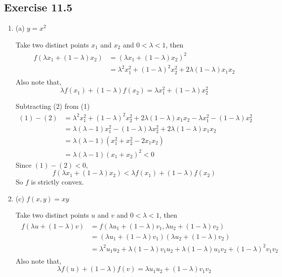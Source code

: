\documentclass{./../../Latex/homework}
\begin{document}
\thispagestyle{plain}

\subsection*{Exercise 11.5} 

\begin{enumerate}
\item (a) $ y = x^2 $
	
	Take two distinct points $x_1$ and $x_2$ and $0<\lambda<1$, then
	\begin{align}
	\begin{split}
		f\left(\lambda x_{1}+(1-\lambda) x_{2}\right) & =\left(\lambda x_{1}+(1-\lambda) x_{2}\right)^{2} \\
& =\lambda^{2} x_{1}^{2}+(1-\lambda)^{2} x_{2}^{2}+2 \lambda(1-\lambda) x_{1} x_{2}
\end{split}
\end{align}
Also note that, 
\begin{equation}
\lambda f\left(x_{1}\right)+(1-\lambda) f\left(x_{2}\right)=\lambda x_{1}^{2}+(1-\lambda) x_{2}^{2} 
\end{equation}

Subtracting (2) from (1)
$$  
\begin{aligned}
(1)-(2) &= \lambda^{2} x_{1}^{2}+(1-\lambda)^{2} x_{2}^{2}+2 \lambda(1-\lambda) x_{1} x_{2}-\lambda x_{1}^{2}-(1-\lambda) x_{2}^{2} \\
&= \lambda(\lambda-1) x_{1}^{2}-(1-\lambda) \lambda x_{2}^{2}+2 \lambda(1-\lambda) x_{1} x_{2} \\
&= \lambda(\lambda-1)\left(x_{1}^{2}+x_{2}^{2}-2 x_{1} x_{2}\right) \\
&= \lambda(\lambda-1)\left(x_{1}+x_{2}\right)^{2}<0 
\end{aligned}
  $$
Since $(1)-(2)<0$, 
$$ f\left(\lambda x_{1}+(1-\lambda) x_{2}\right)<\lambda f\left(x_{1}\right)+(1-\lambda) f\left(x_{2}\right)$$
So $f$ is strictly convex. \\

\item (c) $f(x,y) =xy$

Take two distinct points $u$ and $v$ and $0<\lambda<1$, then
	\begin{align}
	\begin{split}
		 f(\lambda u+(1-\lambda) v)&=f\left(\lambda u_{1}+(1-\lambda) v_{1}, \lambda u_{2}+(1-\lambda) v_{2}\right) \\
		 &=\left(\lambda u_{1}+(1-\lambda) v_{1}\right)\left(\lambda u_{2}+(1-\lambda) v_{2}\right) \\
&=\lambda^{2} u_{1} u_{2}+\lambda(1-\lambda) v_{1} u_{2}+\lambda(1-\lambda) u_{1} v_{2}+(1-\lambda)^{2} v_{1} v_{2}
\end{split}
\end{align}
Also note that, 
\begin{equation}
\lambda f(u)+(1-\lambda) f(v)=\lambda u_{1} u_{2}+(1-\lambda) v_{1} v_{2} 
\end{equation}


\end{enumerate}
\end{document}
